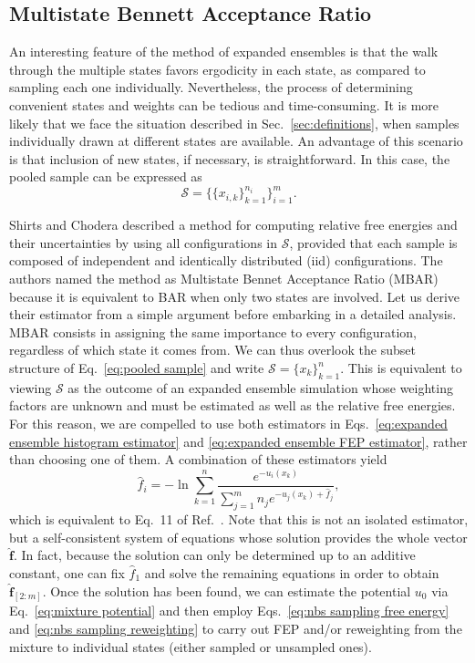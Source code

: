 \documentclass[aip,jcp,reprint,amsmath,amssymb]{revtex4-1}
\newcommand{\vt}[1]{\boldsymbol{\mathbf{#1}}}           %
\begin{document}
\subsection{Multistate Bennett Acceptance Ratio}

An interesting feature of the method of expanded ensembles is that the walk through the multiple states favors ergodicity in each state, as compared to sampling each one individually. Nevertheless, the process of determining convenient states and weights can be tedious and time-consuming. It is more likely that we face the situation described in Sec.~\ref{sec:definitions}, when samples individually drawn at different states are available. An advantage of this scenario is that inclusion of new states, if necessary, is straightforward. In this case, the pooled sample can be expressed as
\begin{equation}
\label{eq:pooled sample}
\mathcal S = \Big\{\{x_{i,k}\}_{k=1}^{n_i}\Big\}_{i=1}^m.
\end{equation}

Shirts and Chodera\cite{Shirts_2008} described a method for computing relative free energies and their uncertainties by using all configurations in $\mathcal S$, provided that each sample is composed of independent and identically distributed (iid) configurations. The authors named the method as Multistate Bennet Acceptance Ratio (MBAR) because it is equivalent to BAR when only two states are involved. Let us derive their estimator from a simple argument before embarking in a detailed analysis. MBAR consists in assigning the same importance to every configuration, regardless of which state it comes from. We can thus overlook the subset structure of Eq.~\eqref{eq:pooled sample} and write $\mathcal S = \{x_k\}_{k=1}^n$. This is equivalent to viewing $\mathcal S$ as the outcome of an expanded ensemble simulation whose weighting factors are unknown and must be estimated as well as the relative free energies. For this reason, we are compelled to use both estimators in Eqs.~\eqref{eq:expanded ensemble histogram estimator} and \eqref{eq:expanded ensemble FEP estimator}, rather than choosing one of them. A combination of these estimators yield
\begin{equation}
\label{eq:mbar free energy estimator}
\hat f_i = -\ln \sum_{k=1}^n \frac{e^{-u_i(x_k)}}{\sum_{j=1}^m n_j e^{-u_j(x_k) + \hat f_j}},
\end{equation}
which is equivalent to Eq.~11 of Ref.~. Note that this is not an isolated estimator, but a self-consistent system of equations whose solution provides the whole vector $\hat {\vt f}$. In fact, because the solution can only be determined up to an additive constant, one can fix $\hat f_1$ and solve the remaining equations in order to obtain $\hat{\vt f}_{[2:m]}$. Once the solution has been found, we can estimate the potential $u_0$ via Eq.~\eqref{eq:mixture potential} and then employ Eqs.~\eqref{eq:nbs sampling free energy} and \eqref{eq:nbs sampling reweighting} to carry out FEP and/or reweighting from the mixture to individual states (either sampled or unsampled ones).\cite{Geyer_1994, Shirts_2017}
\end{document}
